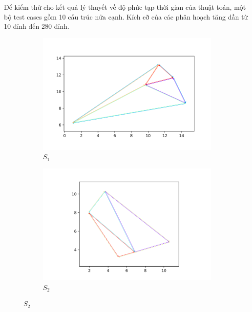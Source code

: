 \documentclass[15pt]{article}
\begin{document}
{Để kiểm thử cho kết quả lý thuyết về độ phức tạp thời gian của thuật toán, một bộ test cases gồm 10 cấu trúc nửa cạnh. Kích cỡ của các phân hoạch tăng dần từ 10 đỉnh đến 280 đỉnh.\\
\begin{figure}
\begin{subfigure}{.5\textwidth}
  \centering
  \includegraphics[width=.8\linewidth]{./10_vertex_overlay.png}
  \caption{$S_1$}
  \label{fig:sfig1}
\end{subfigure}%
\begin{subfigure}{.5\textwidth}
  \centering
  \includegraphics[width=.8\linewidth]{./10_vertex_overlay0.png}
  \caption{$S_2$}
  \label{fig:sfig2}
\end{subfigure}


\end{figure}}
\end{document}
